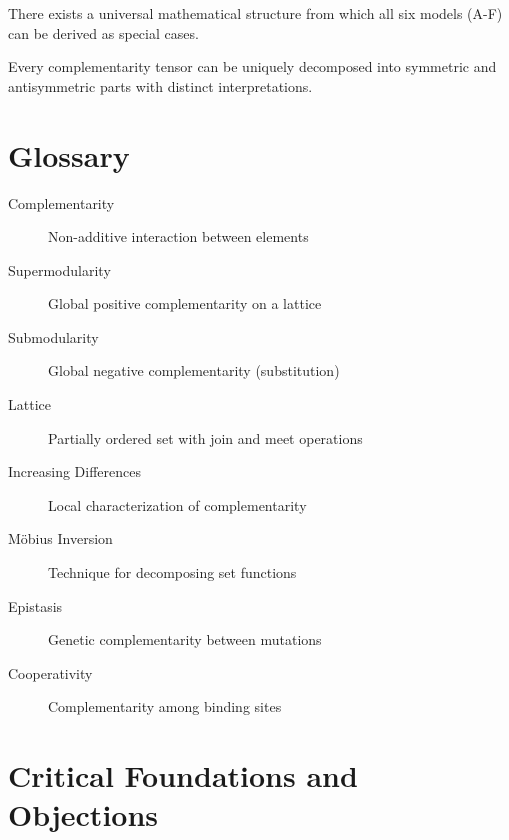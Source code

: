 \begin{conjecture}
There exists a universal mathematical structure from which all six models (A-F) can be derived as special cases.
\end{conjecture}

\begin{conjecture}
Every complementarity tensor can be uniquely decomposed into symmetric and antisymmetric parts with distinct interpretations.
\end{conjecture}

\section{Glossary}
\label{sec:glossary}

\begin{description}
    \item[Complementarity] Non-additive interaction between elements
    \item[Supermodularity] Global positive complementarity on a lattice
    \item[Submodularity] Global negative complementarity (substitution)
    \item[Lattice] Partially ordered set with join and meet operations
    \item[Increasing Differences] Local characterization of complementarity
    \item[Möbius Inversion] Technique for decomposing set functions
    \item[Epistasis] Genetic complementarity between mutations
    \item[Cooperativity] Complementarity among binding sites
\end{description}


\section{Critical Foundations and Objections}
\label{sec:fnd-foundations}


